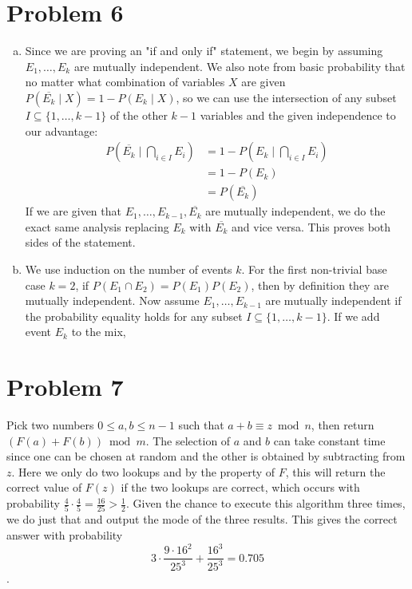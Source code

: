 \documentclass[11pt]{article}
\newcommand{\asdf}{\newline\newline}
\begin{document}
\newpage
\section*{Problem 6}
\begin{enumerate}[(a)]
\item Since we are proving an "if and only if" statement, we begin by assuming $E_1,\ldots,E_k$ are mutually independent.
We also note from basic probability that no matter what combination of variables $X$ are given $P(\overline{E_k} \mid X) = 1 - P(E_k \mid X)$, so we can use the intersection of any subset $I \subseteq \{1,\ldots,k-1\}$ of the other $k-1$ variables and the given independence to our advantage:
\begin{align*}
P(\overline{E_k} \mid \bigcap_{i\in I} E_i) &= 1 - P(E_k \mid \bigcap_{i\in I} E_i)\\
&= 1 - P(E_k)\\
&= P(\overline{E_k})
\end{align*}
If we are given that $E_1,\ldots,E_{k-1},\overline{E_k}$ are mutually independent, we do the exact same analysis replacing $E_k$ with $\overline{E_k}$ and vice versa. This proves both sides of the statement.
\item We use induction on the number of events $k$. For the first non-trivial base case $k=2$, if $P(E_1\cap E_2)=P(E_1)P(E_2)$, then by definition they are mutually independent. \asdf
Now assume $E_1,\ldots,E_{k-1}$ are mutually independent if the probability equality holds for any subset $I \subseteq \{1,\ldots,k-1\}$. If we add event $E_k$ to the mix,
\end{enumerate}


\newpage
\section*{Problem 7}
Pick two numbers $0 \leq a,b \leq n-1$ such that $a+b \equiv z \bmod n$, then return $(F(a)+F(b))\bmod m$. The selection of $a$ and $b$ can take constant time since one can be chosen at random and the other is obtained by subtracting from $z$. Here we only do two lookups and by the property of $F$, this will return the correct value of $F(z)$ if the two lookups are correct, which occurs with probability $\frac45 \cdot \frac45 = \frac{16}{25} > \frac12$. \asdf
Given the chance to execute this algorithm three times, we do just that and output the mode of the three results. This gives the correct answer with probability $$3\cdot \frac{9\cdot 16^2}{25^3} + \frac{16^3}{25^3} = 0.705$$.
\end{document}
